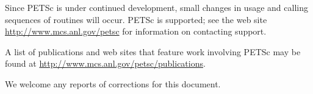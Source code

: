 Since PETSc is under continued development, small changes in usage and
calling sequences of routines will occur.  PETSc is supported; see the
web site \href{http://www.mcs.anl.gov/petsc}{http://www.mcs.anl.gov/petsc} for information on
contacting support.

A list of publications and web sites that feature work involving PETSc may be found at
\href{http://www.mcs.anl.gov/petsc/publications}{http://www.mcs.anl.gov/petsc/publications}.

We welcome any reports of corrections for this document.

\medskip \medskip



